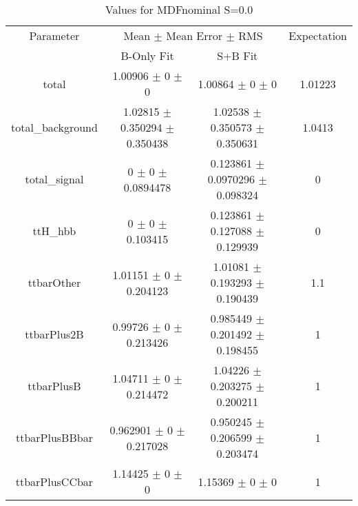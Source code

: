 \begin{table}
\centering
\caption{Values for MDFnominal S=0.0}
\begin{tabular}{cccc}
\toprule
Parameter & \multicolumn{2}{c}{Mean $\pm$ Mean Error $\pm$ RMS} & Expectation\\
 & B-Only Fit & S+B Fit & \\
\midrule
total & \num{1.00906} $\pm$ \num{0} $\pm$ \num{0} & \num{1.00864} $\pm$ \num{0} $\pm$ \num{0} & \num{1.01223}\\
total\_background & \num{1.02815} $\pm$ \num{0.350294} $\pm$ \num{0.350438} & \num{1.02538} $\pm$ \num{0.350573} $\pm$ \num{0.350631} & \num{1.0413}\\
total\_signal & \num{0} $\pm$ \num{0} $\pm$ \num{0.0894478} & \num{0.123861} $\pm$ \num{0.0970296} $\pm$ \num{0.098324} & \num{0}\\
ttH\_hbb & \num{0} $\pm$ \num{0} $\pm$ \num{0.103415} & \num{0.123861} $\pm$ \num{0.127088} $\pm$ \num{0.129939} & \num{0}\\
ttbarOther & \num{1.01151} $\pm$ \num{0} $\pm$ \num{0.204123} & \num{1.01081} $\pm$ \num{0.193293} $\pm$ \num{0.190439} & \num{1.1}\\
ttbarPlus2B & \num{0.99726} $\pm$ \num{0} $\pm$ \num{0.213426} & \num{0.985449} $\pm$ \num{0.201492} $\pm$ \num{0.198455} & \num{1}\\
ttbarPlusB & \num{1.04711} $\pm$ \num{0} $\pm$ \num{0.214472} & \num{1.04226} $\pm$ \num{0.203275} $\pm$ \num{0.200211} & \num{1}\\
ttbarPlusBBbar & \num{0.962901} $\pm$ \num{0} $\pm$ \num{0.217028} & \num{0.950245} $\pm$ \num{0.206599} $\pm$ \num{0.203474} & \num{1}\\
ttbarPlusCCbar & \num{1.14425} $\pm$ \num{0} $\pm$ \num{0} & \num{1.15369} $\pm$ \num{0} $\pm$ \num{0} & \num{1}\\
\bottomrule
\end{tabular}
\end{table}